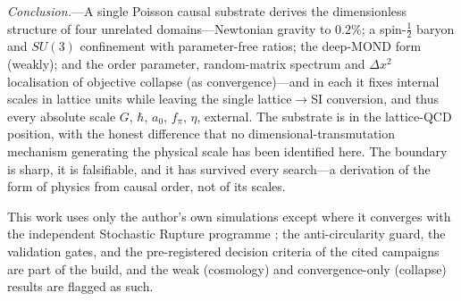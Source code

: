 \documentclass[aps,prl,reprint,nofootinbib,superscriptaddress,floatfix]{revtex4-2}
\begin{document}
\emph{Conclusion.}---A single Poisson causal substrate derives the dimensionless structure
of four unrelated domains---Newtonian gravity to $0.2\%$; a spin-$\tfrac12$ baryon and
$SU(3)$ confinement with parameter-free ratios; the deep-MOND form (weakly); and the
order parameter, random-matrix spectrum and $\Delta x^2$ localisation of objective collapse
(as convergence)---and in each it fixes internal scales in lattice units while leaving the
single lattice$\to$SI conversion, and thus every absolute scale $G$, $\hbar$, $a_0$,
$f_\pi$, $\eta$, external. The substrate is in the lattice-QCD position, with the honest
difference that no dimensional-transmutation mechanism generating the physical scale has
been identified here. The boundary is sharp, it is falsifiable, and it has survived every
search---a derivation of the form of physics from causal order, not of its scales.

\begin{acknowledgments}
This work uses only the author's own simulations except where it converges with the
independent Stochastic Rupture programme \cite{ZambuziSR2026}; the anti-circularity guard,
the validation gates, and the pre-registered decision criteria of the cited campaigns are
part of the build, and the weak (cosmology) and convergence-only (collapse) results are
flagged as such.
\end{acknowledgments}



\end{document}

